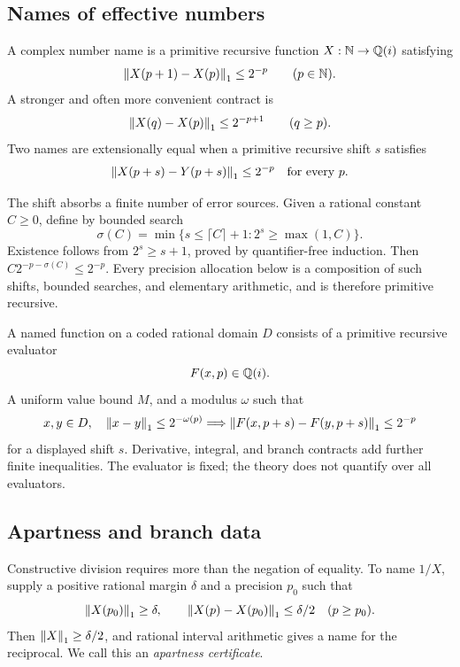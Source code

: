 \subsection{Names of effective numbers}

\begin{definition}\label{def:name}
A complex number name is a primitive recursive function
\(X:\mathbb N\to\mathbb Q(i)\) satisfying
\[
  \left\lVert X(p+1)-X(p)\right\rVert_1\le2^{-p}
  \qquad(p\in\mathbb N).
\]
A stronger and often more convenient contract is
\[
  \left\lVert X(q)-X(p)\right\rVert_1\le2^{-p+1}
  \qquad(q\ge p).
\]
Two names are extensionally equal when a primitive recursive shift \(s\)
satisfies
\[
  \left\lVert X(p+s)-Y(p+s)\right\rVert_1\le 2^{-p}
  \quad\text{for every }p.
\]
\end{definition}

The shift absorbs a finite number of error sources.  Given a rational
constant \(C\ge0\), define by bounded search
\[
 \sigma(C)=\min\{s\le \lceil C\rceil+1:2^s\ge\max(1,C)\}.
\]
Existence follows from \(2^s\ge s+1\), proved by quantifier-free induction.
Then \(C2^{-p-\sigma(C)}\le2^{-p}\).  Every precision allocation below is a
composition of such shifts, bounded searches, and elementary arithmetic, and
is therefore primitive recursive.

\begin{definition}\label{def:named-function}
A named function on a coded rational domain \(D\) consists of a primitive
recursive evaluator
\[
  F(x,p)\in\mathbb Q(i).
\]
A uniform value bound \(M\), and a modulus \(\omega\) such that
\[
  x,y\in D,\quad \left\lVert x-y\right\rVert_1\le2^{-\omega(p)}
   \Longrightarrow \left\lVert F(x,p+s)-F(y,p+s)\right\rVert_1\le2^{-p}
\]
for a displayed shift \(s\).  Derivative, integral, and branch contracts add
further finite inequalities.  The evaluator is fixed; the theory does not
quantify over all evaluators.
\end{definition}

\subsection{Apartness and branch data}

Constructive division requires more than the negation of equality.  To name
\(1/X\), supply a positive rational margin \(\delta\) and a precision
\(p_0\) such that
\[
  \left\lVert X(p_0)\right\rVert_1\ge\delta,
  \qquad
  \left\lVert X(p)-X(p_0)\right\rVert_1\le\delta/2\quad(p\ge p_0).
\]
Then \(\left\lVert X\right\rVert_1\ge\delta/2\), and rational interval arithmetic gives a name
for the reciprocal.  We call this an \emph{apartness certificate}.

